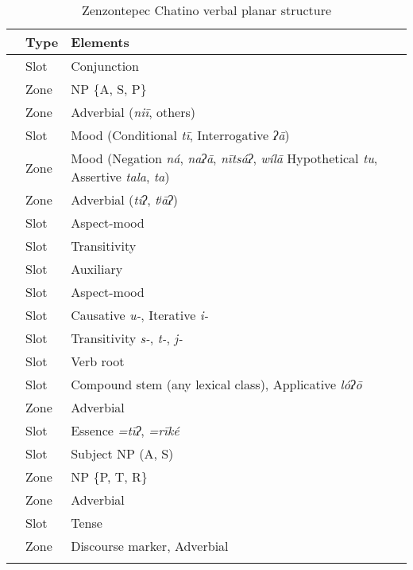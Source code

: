 \documentclass[output=paper]{langscibook}
\begin{document}
\begin{table}
    \centering
    \caption{Zenzontepec Chatino verbal planar structure}
    \label{tab:zenz:key:1}
         \begin{tabular}{Slp{9cm}}
\lsptoprule
{} & Type & Elements \\ \midrule
\label{zen1con} & Slot & Conjunction\\
\label{zen2np} & Zone & NP \{A, S, P\}\\
\label{zen3adv} & Zone & Adverbial (\textit{niī}, others)\\
\label{zen4con} & Slot & Mood (Conditional \textit{tī}, Interrogative \textit{ʔā})\\
\label{zen5md} & Zone & Mood (Negation \textit{ná}, \textit{naʔā}, \textit{nītsáʔ}, \textit{wílā} Hypothetical \textit{tu}, Assertive \textit{tala}, \textit{ta})\\
\label{zen6adv} & Zone & Adverbial (\textit{tíʔ}, \textit{tʲāʔ})\\
\label{zen7am} & Slot & Aspect-mood\\
\label{zen8tr} & Slot & Transitivity\\
\label{zen9aux} & Slot & Auxiliary\\
\label{zen10am} & Slot & Aspect-mood\\
\label{zen11cau} & Slot & Causative \textit{u-}, Iterative \textit{i-}\\
\label{zen12tr} & Slot & Transitivity \textit{s-}, \textit{t-}, \textit{j-}\\
\label{zen13base} & Slot & Verb root\\
\label{zen14com} & Slot & Compound stem (any lexical class), Applicative \textit{lóʔō }\\
\label{zen15adv} & Zone & Adverbial\\
\label{zen16ess} & Slot & Essence \textit{=tīʔ}, \textit{=rīké}\\
\label{zen17sub} & Slot & Subject NP (A, S)\\
\label{zen18np} & Zone & NP \{P, T, R\}\\
\label{zen19adv} & Zone & Adverbial\\
\label{zen20ten} & Slot & Tense\\
\label{zen21dm} & Zone & Discourse marker, Adverbial\\
\lspbottomrule
    \end{tabular}
\end{table}
\end{document}
